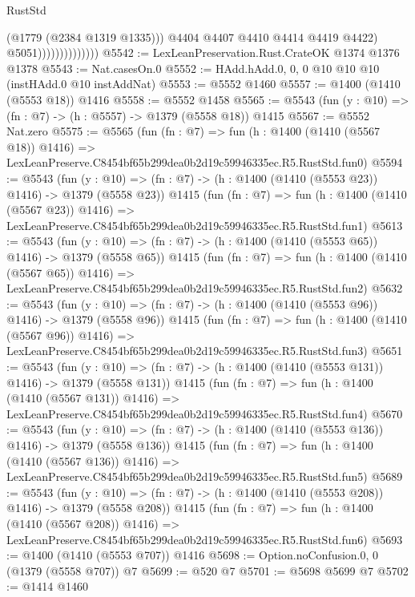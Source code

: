 \begin{lexlean}{RustStd}
\begin{coremodule}
                                    (@1779 (@2384 @1319 @1335)))
                                  @4404
                                  @4407
                                  @4410
                                  @4414
                                  @4419
                                  @4422)
                                @5051))))))))))))))
@5542 := LexLeanPreservation.Rust.CrateOK @1374 @1376 @1378
@5543 := Nat.casesOn.{0}
@5552 := HAdd.hAdd.{0, 0, 0} @10 @10 @10 (instHAdd.{0} @10 instAddNat)
@5553 := @5552 @1460
@5557 := @1400 (@1410 (@5553 @18)) @1416
@5558 := @5552 @1458
@5565 := @5543 (fun (y : @10) => (fn : @7) -> (h : @5557) -> @1379 (@5558 @18)) @1415
@5567 := @5552 Nat.zero
@5575 := @5565
    (fun (fn : @7) =>
    fun (h : @1400 (@1410 (@5567 @18)) @1416) =>
    LexLeanPreserve.C8454bf65b299dea0b2d19c59946335ec.R5.RustStd.fun0)
@5594 := @5543
    (fun (y : @10) => (fn : @7) -> (h : @1400 (@1410 (@5553 @23)) @1416) -> @1379 (@5558 @23))
    @1415
    (fun (fn : @7) =>
    fun (h : @1400 (@1410 (@5567 @23)) @1416) =>
    LexLeanPreserve.C8454bf65b299dea0b2d19c59946335ec.R5.RustStd.fun1)
@5613 := @5543
    (fun (y : @10) => (fn : @7) -> (h : @1400 (@1410 (@5553 @65)) @1416) -> @1379 (@5558 @65))
    @1415
    (fun (fn : @7) =>
    fun (h : @1400 (@1410 (@5567 @65)) @1416) =>
    LexLeanPreserve.C8454bf65b299dea0b2d19c59946335ec.R5.RustStd.fun2)
@5632 := @5543
    (fun (y : @10) => (fn : @7) -> (h : @1400 (@1410 (@5553 @96)) @1416) -> @1379 (@5558 @96))
    @1415
    (fun (fn : @7) =>
    fun (h : @1400 (@1410 (@5567 @96)) @1416) =>
    LexLeanPreserve.C8454bf65b299dea0b2d19c59946335ec.R5.RustStd.fun3)
@5651 := @5543
    (fun (y : @10) => (fn : @7) -> (h : @1400 (@1410 (@5553 @131)) @1416) -> @1379 (@5558 @131))
    @1415
    (fun (fn : @7) =>
    fun (h : @1400 (@1410 (@5567 @131)) @1416) =>
    LexLeanPreserve.C8454bf65b299dea0b2d19c59946335ec.R5.RustStd.fun4)
@5670 := @5543
    (fun (y : @10) => (fn : @7) -> (h : @1400 (@1410 (@5553 @136)) @1416) -> @1379 (@5558 @136))
    @1415
    (fun (fn : @7) =>
    fun (h : @1400 (@1410 (@5567 @136)) @1416) =>
    LexLeanPreserve.C8454bf65b299dea0b2d19c59946335ec.R5.RustStd.fun5)
@5689 := @5543
    (fun (y : @10) => (fn : @7) -> (h : @1400 (@1410 (@5553 @208)) @1416) -> @1379 (@5558 @208))
    @1415
    (fun (fn : @7) =>
    fun (h : @1400 (@1410 (@5567 @208)) @1416) =>
    LexLeanPreserve.C8454bf65b299dea0b2d19c59946335ec.R5.RustStd.fun6)
@5693 := @1400 (@1410 (@5553 @707)) @1416
@5698 := Option.noConfusion.{0, 0} (@1379 (@5558 @707)) @7
@5699 := @520 @7
@5701 := @5698 @5699 @7
@5702 := @1414 @1460

\end{coremodule}
\end{lexlean}
